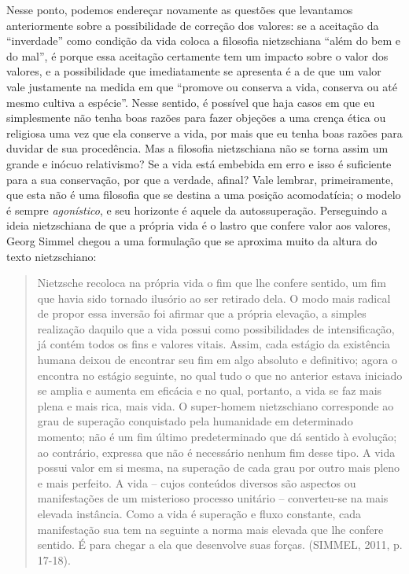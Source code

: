 \documentclass[
	12pt,				%
	openright,			%
	oneside,			%
	a4paper,			%
	english,			%
	french,				%
	spanish,			%
	brazil				%
	]{abntex2}
\begin{document}
Nesse ponto, podemos endereçar novamente as questões que levantamos anteriormente sobre a possibilidade de correção dos valores: se a aceitação da “inverdade” como condição da vida coloca a filosofia nietzschiana “além do bem e do mal”, é porque essa aceitação certamente tem um impacto sobre o valor dos valores, e a possibilidade que imediatamente se apresenta é a de que um valor vale justamente na medida em que  “promove ou conserva a vida, conserva ou até mesmo cultiva a espécie”. Nesse sentido, é possível que haja casos em que eu simplesmente não tenha boas razões para fazer objeções a uma crença ética ou religiosa uma vez que ela conserve a vida, por mais que eu tenha boas razões para duvidar de sua procedência. Mas a filosofia nietzschiana não se torna assim um grande e inócuo relativismo? Se a vida está embebida em erro e isso é suficiente para a sua conservação, por que a verdade, afinal? Vale lembrar, primeiramente, que esta não é uma filosofia que se destina a uma posição acomodatícia; o modelo é sempre \textit{agonístico}, e seu horizonte é aquele da autossuperação. Perseguindo a ideia nietzschiana de que a própria vida é o lastro que confere valor aos valores, Georg Simmel chegou a uma formulação que se aproxima muito da altura do texto nietzschiano:

\begin{quotation}
Nietzsche recoloca na própria vida o fim que lhe confere sentido, um fim que havia sido tornado ilusório ao ser retirado dela. O modo mais radical de propor essa inversão foi afirmar que a própria elevação, a simples realização daquilo que a vida possui como possibilidades de intensificação, já contém todos os fins e valores vitais. Assim, cada estágio da existência humana deixou de encontrar seu fim em algo absoluto e definitivo; agora o encontra no estágio seguinte, no qual tudo o que no anterior estava iniciado se amplia e aumenta em eficácia e no qual, portanto, a vida se faz mais plena e mais rica, mais vida. O super-homem nietzschiano corresponde ao grau de superação conquistado pela humanidade em determinado momento; não é um fim último predeterminado que dá sentido à evolução; ao contrário, expressa que não é necessário nenhum fim desse tipo. A vida possui valor em si mesma, na superação de cada grau por outro mais pleno e mais perfeito. A vida – cujos conteúdos diversos são aspectos ou manifestações de um misterioso processo unitário – converteu-se na mais elevada instância. Como a vida é superação e fluxo constante, cada manifestação sua tem na seguinte a norma mais elevada que lhe confere sentido. É para chegar a ela que desenvolve suas forças. (SIMMEL, 2011, p. 17-18).
\end{quotation}
\end{document}
